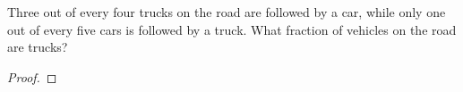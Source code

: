 \begin{problem}{4.30}
  Three out of every four trucks on the road are followed by a car, while only
  one out of every five cars is followed by a truck. What fraction of vehicles
  on the road are trucks?
\end{problem}

\begin{proof}
\end{proof}
\newpage
